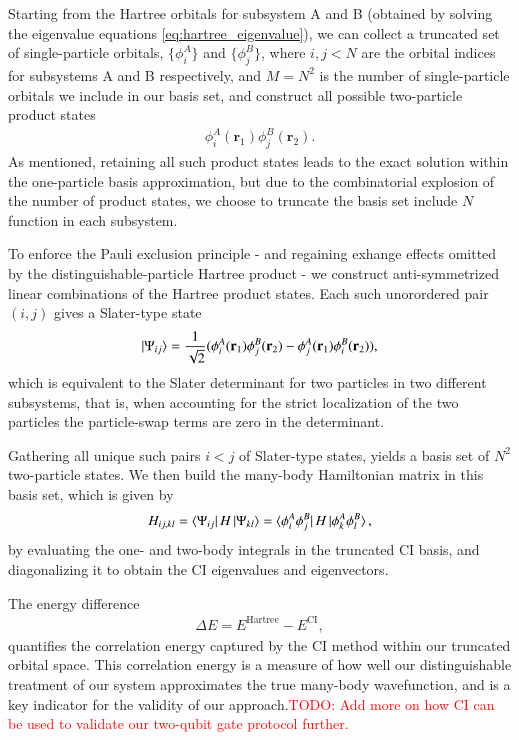 \documentclass{subfiles}
\begin{document}
Starting from the Hartree orbitals for subsystem A and B (obtained by solving the eigenvalue equations \ref{eq:hartree_eigenvalue}), we can collect a truncated set of single-particle orbitals, $\{\phi^A_i\}$ and $\{\phi^B_j\}$, where $i,j<N$ are the orbital indices for subsystems A and B respectively, and $M=N^2$ is the number of single-particle orbitals we include in our basis set, and construct all possible two-particle product states
\begin{align*}
    \phi_i^A(\mathbf{r}_1)\phi_j^B(\mathbf{r}_2).
\end{align*}  
As mentioned, retaining all such product states leads to the exact solution within the one-particle basis approximation, but due to the combinatorial explosion of the number of product states, we choose to truncate the basis set include $N$ function in each subsystem. 

To enforce the Pauli exclusion principle - and regaining exhange effects omitted by the distinguishable-particle Hartree product - we construct anti-symmetrized linear combinations of the Hartree product states. Each such unorordered pair $(i,j)$ gives a Slater-type state
\begin{align*}
    \ket{\Psi_{ij}} = \frac{1}{\sqrt{2}}(\phi_i^A(\mathbf{r}_1)\phi_j^B(\mathbf{r}_2) - \phi_j^A(\mathbf{r}_1)\phi_i^B(\mathbf{r}_2)),
\end{align*}
which is equivalent to the Slater determinant for two particles in two different subsystems, that is, when accounting for the strict localization of the two particles the particle-swap terms are zero in the determinant. 

Gathering all unique such pairs $i<j$ of Slater-type states, yields a basis set of $N^2$ two-particle states. We then build the many-body Hamiltonian matrix in this basis set, which is given by
\begin{align*}
    H_{ij,kl} = \bra{\Psi_{ij}}H\ket{\Psi_{kl}} = \bra{\phi_i^A\phi_j^B}H\ket{\phi_k^A\phi_l^B},
\end{align*}
by evaluating the one- and two-body integrals in the truncated CI basis, and diagonalizing it to obtain the CI eigenvalues and eigenvectors. 

The energy difference
\begin{align*}
    \Delta E = E^{\text{Hartree}} - E^{\text{CI}},
\end{align*}
quantifies the correlation energy captured by the CI method within our truncated orbital space. This correlation energy is a measure of how well our distinguishable treatment of our system approximates the true many-body wavefunction, and is a key indicator for the validity of our approach.\textcolor{red}{TODO: Add more on how CI can be used to validate our two-qubit gate protocol further.}
\end{document}
